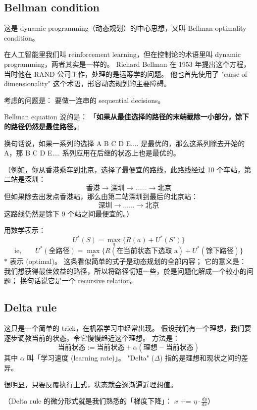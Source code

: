 \subsection{Bellman condition}

这是 dynamic programming（动态规划）的中心思想，又叫 Bellman optimality condition。

在人工智能里我们叫 reinforcement learning，但在控制论的术语里叫 dynamic programming，两者其实是一样的。 Richard Bellman 在 1953 年提出这个方程，当时他在 RAND 公司工作，处理的是运筹学的问题。 他也首先使用了 "curse of dimensionality" 这个术语，形容动态规划的主要障碍。

考虑的问题是： 要做一连串的 sequential decisions。

Bellman equation 说的是： 「\textbf{如果从最佳选择的路径的末端截除一小部分，馀下的路径仍然是最佳路径。}」

换句话说，如果一系列的选择 A B C D E.... 是最优的，那么这系列除去开始的 A，那 B C D E.... 系列应用在后继的状态上也是最优的。

（例如，你从香港乘车到北京，选择了最便宜的路线，此路线经过 10 个车站，第二站是深圳：
$$ \mbox{香港} \rightarrow \mbox{深圳} \rightarrow ... ... \rightarrow \mbox{北京} $$
但如果除去出发点香港站，那么由第二站深圳到最后的北京站：
$$ \mbox{深圳} \rightarrow ... ... \rightarrow \mbox{北京} $$
这路线仍然是馀下 9 个站之间最便宜的。）

用数学表示：
$$ U^*(S) = \max_a \{ R(a) + U^*(S') \} $$
$$ \mbox{ie,} \quad \quad U^*(\mbox{全路径}) = \max_a \{ R(\mbox{在当前状态下选取 a}) + U^*(\mbox{馀下路径}) \} $$
$*$ 表示  (optimal)。 这条看似简单的式子是动态规划的全部内容； 它的意义是： 我们想获得最佳效益的路径，所以将路径切短一些，於是问题化解成一个较小的问题；  换句话说它是一个 recursive relation。

\subsection{Delta rule}

这只是一个简单的 trick，在机器学习中经常出现。  假设我们有一个理想，我们要逐步调教当前的状态，令它慢慢趋近这个理想。 方法是： 
$$ \mbox{当前状态} := \mbox{当前状态} + \alpha ( \mbox{理想} - \mbox{当前状态}) $$
其中 $\alpha$ 叫「学习速度 (learning rate)」。 "Delta" ($\Delta$) 指的是理想和现状之间的差异。

很明显，只要反覆执行上式，状态就会逐渐逼近理想值。

（Delta rule 的微分形式就是我们熟悉的「梯度下降」： $x \mbox{ += } \eta \cdot \frac{dy}{dx}$）

